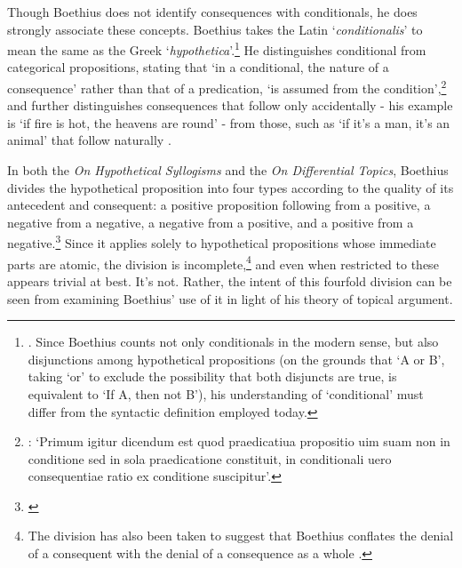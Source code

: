 \documentclass[a4paper, 11pt]{article}
\begin{document}
Though Boethius does not identify consequences with conditionals, he does strongly associate these concepts. Boethius takes the Latin `\emph{conditionalis}' to mean the same as the Greek `\emph{hypothetica}'.\footnote{\autocite[1.3.2]{BHS}. Since Boethius counts not only conditionals in the modern sense, but also disjunctions among hypothetical propositions (on the grounds that `A or B', taking `or' to exclude the possibility that both disjuncts are true, is equivalent to `If A, then not B'), his understanding of `conditional' must differ from the syntactic definition employed today.} He distinguishes conditional from categorical propositions, stating that `in a conditional, the nature of a consequence' rather than that of a predication, `is assumed from the condition',\footnote{\autocite[1.1.6]{BHS}: `Primum igitur dicendum est quod praedicatiua propositio uim suam non in conditione sed in sola praedicatione constituit, in conditionali uero consequentiae ratio ex conditione suscipitur'.} 
and further distinguishes consequences that follow only accidentally 
- his example is `if fire is hot, the heavens are round' - 
from those, such as `if it's a man, it's an animal' that follow naturally \autocite[1.3.6-1.3.7]{BHS}. 

In both the \emph{On Hypothetical Syllogisms} and the \emph{On Differential Topics}, 
Boethius divides the hypothetical proposition into four types according to the quality of its antecedent and consequent: 
a positive proposition following from a positive, 
a negative from a negative, 
a negative from a positive, 
and a positive from a negative.\footnote{\autocite[1.3.5]{BHS} \autocite[1176B-C]{BDT}} Since it applies solely to hypothetical propositions whose immediate parts are atomic, the division is incomplete,\footnote{The division has also been taken to suggest that Boethius conflates the denial of a consequent with the denial of a consequence as a whole \autocite[157-158]{Martin2007}.} and even when restricted to these appears trivial at best. It's not. Rather, the intent of this fourfold division can be seen from examining Boethius' use of it in light of his theory of topical argument.
\end{document}
